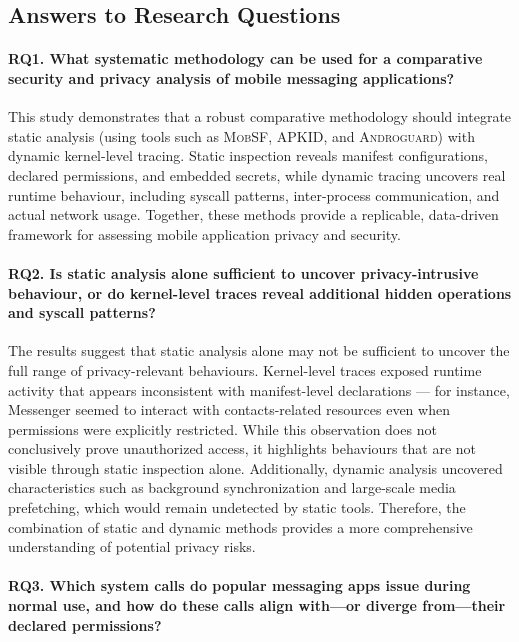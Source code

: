 \documentclass[a4paper,12pt]{report}
\begin{document}
\subsection{Answers to Research Questions}

\paragraph{\textbf{RQ1.} What systematic methodology can be used for a comparative security and privacy analysis of mobile messaging applications?}

This study demonstrates that a robust comparative methodology should integrate static analysis (using tools such as \textsc{MobSF}, \textsc{APKID}, and \textsc{Androguard}) with dynamic kernel-level tracing. Static inspection reveals manifest configurations, declared permissions, and embedded secrets, while dynamic tracing uncovers real runtime behaviour, including syscall patterns, inter-process communication, and actual network usage. Together, these methods provide a replicable, data-driven framework for assessing mobile application privacy and security.

\paragraph{\textbf{RQ2.} Is static analysis alone sufficient to uncover privacy-intrusive behaviour, or do kernel-level traces reveal additional hidden operations and syscall patterns?}

The results suggest that static analysis alone may not be sufficient to uncover the full range of privacy-relevant behaviours. Kernel-level traces exposed runtime activity that appears inconsistent with manifest-level declarations — for instance, Messenger seemed to interact with contacts-related resources even when permissions were explicitly restricted. While this observation does not conclusively prove unauthorized access, it highlights behaviours that are not visible through static inspection alone. Additionally, dynamic analysis uncovered characteristics such as background synchronization and large-scale media prefetching, which would remain undetected by static tools. Therefore, the combination of static and dynamic methods provides a more comprehensive understanding of potential privacy risks.

\paragraph{\textbf{RQ3.} Which system calls do popular messaging apps issue during normal use, and how do these calls align with—or diverge from—their declared permissions?}
\end{document}

